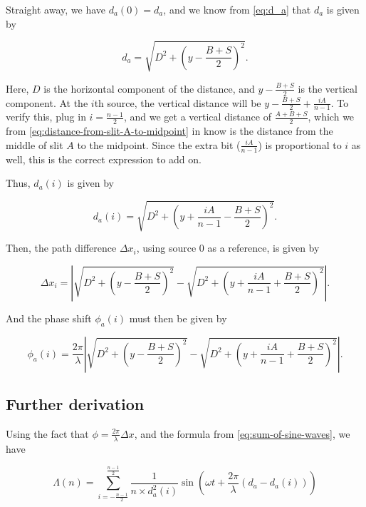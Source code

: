 \documentclass{paper}
\begin{document}
Straight away, we have $d_a(0) = d_a$, and we know from \eqref{eq:d_a} that $d_a$ is given by

\begin{equation*}
    d_a = \sqrt{D^2 + \left(y - \frac{B + S}{2}\right)^2}.
\end{equation*}

Here, $D$ is the horizontal component of the distance, and $y - \frac{B + S}{2}$ is the vertical component. At the $i$th source, the vertical distance will be $y - \frac{B + S}{2} + \frac{iA}{n - 1}$. To verify this, plug in $i = \frac{n - 1}{2}$, and we get a vertical distance of $\frac{A + B + S}{2}$, which we from \eqref{eq:distance-from-slit-A-to-midpoint} in   know is the distance from the middle of slit $A$ to the midpoint. Since the extra bit ($\frac{iA}{n - 1}$) is proportional to $i$ as well, this is the correct expression to add on.

Thus, $d_a(i)$ is given by

\begin{equation}
    \label{eq:d_a(i)}
    d_a(i) = \sqrt{D^2 + \left(y + \frac{iA}{n - 1} - \frac{B + S}{2}\right)^2}.
\end{equation}

Then, the path difference $\Delta{x}_i$, using source $0$ as a reference, is given by

\begin{equation*}
    \Delta{x}_i = \left\lvert \sqrt{D^2 + \left(y - \frac{B + S}{2}\right)^2} - \sqrt{D^2 + \left(y + \frac{iA}{n - 1} + \frac{B + S}{2}\right)^2} \right\rvert.
\end{equation*}

And the phase shift $\phi_a(i)$ must then be given by

\begin{equation}
    \label{eq:phi_a(i)}
    \phi_a(i) = \frac{2\pi}{\lambda}\left\lvert \sqrt{D^2 + \left(y - \frac{B + S}{2}\right)^2} - \sqrt{D^2 + \left(y + \frac{iA}{n - 1} + \frac{B + S}{2}\right)^2} \right\rvert.
\end{equation}

\subsection{Further derivation}

Using the fact that $\phi = \frac{2\pi}{\lambda}\Delta{x}$, and the formula from \eqref{eq:sum-of-sine-waves}, we have

\begin{equation*}
    \Lambda(n) = \sum_{i = -\frac{n - 1}{2}}^{\frac{n - 1}{2}} \frac{1}{n \times d_a^2(i)} \sin\left(\omega t + \frac{2\pi}{\lambda}(d_a - d_a(i))\right)
\end{equation*}
\end{document}
